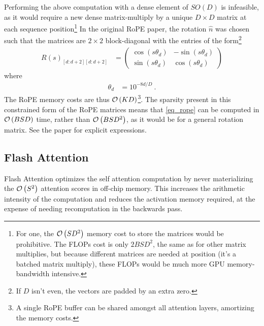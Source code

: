 Performing the above computation with a dense element of $ SO(D) $ is infeasible, as it would
require a new dense matrix-multiply by a unique $ D \times D $ matrix at each sequence
position\footnote{For one, the $ \mathcal{O} \left( SD ^{ 2 } \right)  $ memory cost to store the matrices
    would be prohibitive. The FLOPs cost is only $ 2BSD ^{ 2 } $, the same as for other matrix
multiplies, but because different matrices are needed at position (it's a batched matrix multiply),
these FLOPs would be much more GPU memory-bandwidth intensive.} In the original RoPE paper, the
rotation $ \hat{n} $ was chosen such that the matrices are $ 2 \times  2 $ block-diagonal with the
entries of the form\footnote{If $ D $ isn't even, the vectors are padded by an extra zero.}
\begin{align}
	R(s)_{ [d:d+2][d:d+2] } & =\begin{pmatrix}
		                           \cos \left ( s \theta _{ d }   \right ) & -\sin \left ( s \theta _{ d }   \right ) \\
		                           \sin \left ( s \theta _{ d }   \right ) & \cos \left ( s \theta _{ d }   \right )
	                           \end{pmatrix}
\end{align}
where
\begin{align}
	\theta _{ d } & = 10 ^{ -8d/D   } \ .
\end{align}
The RoPE memory costs are thus $ \mathcal{O} \left( K D \right)  $\footnote{A single RoPE buffer can be
shared amongst all attention layers, amortizing the memory costs.}. The sparsity present in this constrained form of the RoPE matrices means that
\eqref{eq_rope} can be computed in $ \mathcal{O} \left( BSD \right)  $ time, rather than $ \mathcal{O} \left(
BSD ^{ 2 } \right)$, as it would be for a general rotation matrix. See the paper for explicit
expressions.


\subsection{Flash Attention \label{subsec_flash_attention}}


Flash Attention \cite{dao2022flashattention, dao2023flashattention2} optimizes the self attention
computation by never materializing the $ \mathcal{O} \left( S ^{ 2 } \right)  $ attention scores in
off-chip memory. This increases the arithmetic intensity of the computation and reduces the
activation memory required, at the expense of needing recomputation in the backwards pass.


